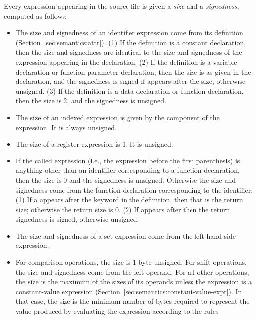 \documentclass[10pt]{article}
\begin{document}
 Every expression
appearing in the source file is given a \emph{size} and a
\emph{signedness}, computed as follows:
%
\begin{itemize}
%
\item {} The size and signedness of an identifier
  expression come from its definition
  (Section~\ref{sec:semantics:attr}).  (1) If the definition is a
  constant declaration, then the size and signedness are identical to
  the size and signedness of the expression appearing in the
  declaration.  (2) If the definition is a variable declaration or
  function parameter declaration, then the size is as given in the
  declaration, and the signedness is signed if  appears after
  the size, otherwise unsigned.  (3) If the definition is a data
  declaration or function declaration, then the size is 2, and the
  signedness is unsigned.
%
\item {} The size of an indexed expression
  is given by the  component of the expression.  It is
  always unsigned.  
%
\item {} The size of a register expression
  is 1.  It is unsigned.
%
\item {} If the called expression (i.e., the
  expression before the first parenthesis) is anything other than an
  identifier corresponding to a function declaration, then the size is
  0 and the signedness is unsigned.  Otherwise the size and signedness
  come from the function declaration corresponding to the identifier:
  (1) If a  appears after the keyword  in the
  definition, then that is the return size; otherwise the return size
  is 0.  (2) If  appears after  then the return
  signedness is signed, otherwise unsigned.
%
\item {} The size and signedness of a set
  expression come from the left-hand-side expression.
%
\item {}  For comparison
  operations, the size is 1 byte unsigned.  For shift operations, the
  size and signedness come from the left operand.  For all other
  operations, the size is the maximum of the sizes of its operands
  unless the expression is a constant-value expression
  (Section~\ref{sec:semantics:constant-value-expr}).  In that case,
  the size is the minimum number of bytes required to represent the
  value produced by evaluating the expression according to the rules

\end{itemize}
\end{document}
